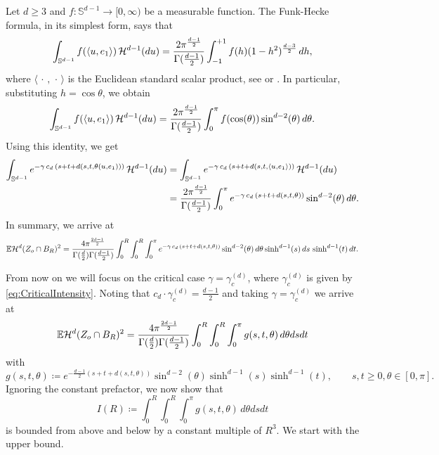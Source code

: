 \documentclass[11pt,a4paper]{article}
\theoremstyle{plain}
\theoremstyle{definition}
\theoremstyle{remark}
\def\EE{\mathbb{E}}
\def\SS{\mathbb{S}}
\def\cH{\mathcal{H}}
\begin{document}
Let $d \geq 3$ and $f \colon \SS^{d-1} \to [0,\infty)$ be a measurable function. The Funk-Hecke formula, in its simplest form, says that
$$
\int_{\SS^{d-1}} f(\langle u,e_1\rangle)\,\cH^{d-1}(du) = {2\pi^{d-1\over 2}\over\Gamma({d-1\over 2})}\int_{-1}^{+1}f(h)(1-h^2)^{d-3\over 2}\,dh,
$$
where $\langle\,\cdot\,,\,\cdot\,\rangle$ is the Euclidean standard scalar product, see \cite[Equation (2.6)]{KSTBook} or \cite[Theorem 6]{MuellerBook}. In particular, substituting $h=\cos\theta$, we obtain
\begin{equation*}
    \int_{\SS^{d-1}} f(\langle u,e_1\rangle)\, \cH^{d-1}(du) 
    = {2\pi^{d-1\over 2}\over\Gamma({d-1\over 2})} \int_0^\pi f(\cos(\theta)) \sin^{d-2}(\theta) \,d\theta.
\end{equation*}
Using this identity, we get
\begin{align*}
\int_{\SS^{d-1}}e^{-\gamma\, c_d \, (s+t+d(s,t,\theta(u,e_1)))} \,\cH^{d-1}(du) &= \int_{\SS^{d-1}}e^{-\gamma\, c_d \, (s+t+d(s,t,\langle u,e_1\rangle))} \,\cH^{d-1}(du)\\
&= {2\pi^{d-1\over 2}\over\Gamma({d-1\over 2})} \int_0^\pi e^{-\gamma\, c_d \, (s+t+d(s,t,\theta))} \sin^{d-2}(\theta)\, d\theta.
\end{align*}
In summary, we arrive at
\[ \EE\cH^d(Z_o\cap B_R)^2
= {4\pi^{2d-1\over 2}\over\Gamma({d\over 2})\Gamma({d-1\over 2})} \int_0^R \int_0^R \int_0^\pi 
e^{-\gamma\, c_d \, (s+t+d(s,t,\theta))} \sin^{d-2}(\theta)\, d\theta \sinh^{d-1}(s)\,ds \,\sinh^{d-1}(t)\,dt. \]

From now on we will focus on the critical case $\gamma = \gamma_c^{(d)}$, where $\gamma_c^{(d)}$ is given by \eqref{eq:CriticalIntensity}. Noting that $c_d \cdot \gamma_c^{(d)} = \frac{d-1}{2}$ and taking $\gamma = \gamma_c^{(d)}$ we arrive at
\begin{equation}\label{eq:TruncSecMomInt}
\EE\cH^d(Z_o\cap B_R)^2
= {4\pi^{2d-1\over 2}\over\Gamma({d\over 2})\Gamma({d-1\over 2})} \int_0^R \int_0^R \int_0^\pi 
g(s,t,\theta)\, d\theta ds dt
\end{equation}
with
\[ g(s,t,\theta) \coloneqq e^{- \frac{d-1}{2}(s+t+d(s,t,\theta))} \sin^{d-2}(\theta) \sinh^{d-1}(s)\sinh^{d-1}(t),\qquad s,t \geq 0, \theta \in [0,\pi]. \]
Ignoring the constant prefactor, we now show that
\[ I(R) \coloneqq \int_0^R \int_0^R \int_0^\pi 
g(s,t,\theta)\, d\theta ds dt\]
is bounded from above and below by a constant multiple of $R^3$. We start with the upper bound.
\end{document}
